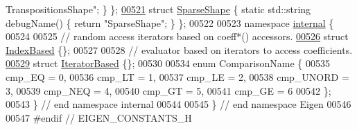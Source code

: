 \begin{DoxyCode}
{      TranspositionsShape"}; \} \};
\hyperlink{struct_eigen_1_1_sparse_shape}{00521} \textcolor{keyword}{struct }\hyperlink{struct_eigen_1_1_sparse_shape}{SparseShape}            \{ \textcolor{keyword}{static} std::string debugName() \{ \textcolor{keywordflow}{return} \textcolor{stringliteral}{"SparseShape"}; \} \};
00522 
00523 \textcolor{keyword}{namespace }\hyperlink{namespaceinternal}{internal} \{
00524 
00525   \textcolor{comment}{// random access iterators based on coeff*() accessors.}
\hyperlink{struct_eigen_1_1internal_1_1_index_based}{00526} \textcolor{keyword}{struct }\hyperlink{struct_eigen_1_1internal_1_1_index_based}{IndexBased} \{\};
00527 
00528 \textcolor{comment}{// evaluator based on iterators to access coefficients. }
\hyperlink{struct_eigen_1_1internal_1_1_iterator_based}{00529} \textcolor{keyword}{struct }\hyperlink{struct_eigen_1_1internal_1_1_iterator_based}{IteratorBased} \{\};
00530 
00534 \textcolor{keyword}{enum} ComparisonName \{
00535   cmp\_EQ = 0,
00536   cmp\_LT = 1,
00537   cmp\_LE = 2,
00538   cmp\_UNORD = 3,
00539   cmp\_NEQ = 4,
00540   cmp\_GT = 5,
00541   cmp\_GE = 6
00542 \};
00543 \} \textcolor{comment}{// end namespace internal}
00544 
00545 \} \textcolor{comment}{// end namespace Eigen}
00546 
00547 \textcolor{preprocessor}{#endif // EIGEN\_CONSTANTS\_H}
\end{DoxyCode}
